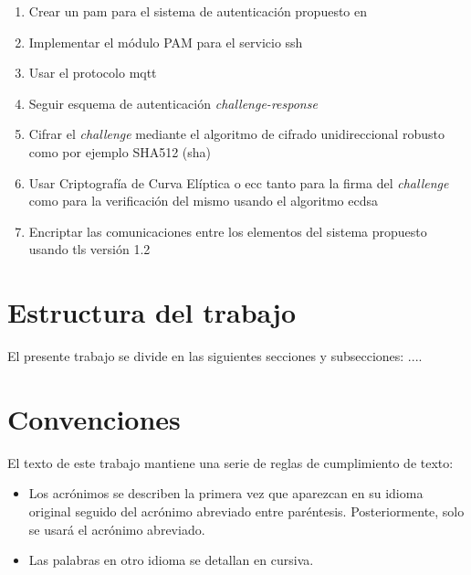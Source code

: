 \begin{enumerate}
    \item Crear un \acrfull{pam} para el sistema de autenticación propuesto en \cite{multipauthpaper}
    \item Implementar el módulo PAM para el servicio \acrfull{ssh}
    \item Usar el protocolo \acrfull{mqtt}
    \item Seguir esquema de autenticación \textit{challenge-response} \cite{newman2010salted}
    \item Cifrar el \textit{challenge} mediante el algoritmo de cifrado unidireccional robusto como por ejemplo SHA512 
    (\acrlong{sha})
    \item Usar Criptografía de Curva Elíptica o \acrfull{ecc} tanto para la firma del \textit{challenge} como para la verificación del mismo 
    usando el algoritmo \acrfull{ecdsa}
    \item Encriptar las comunicaciones entre los elementos del sistema propuesto usando \acrfull{tls} versión 1.2
\end{enumerate}

\section{Estructura del trabajo}

El presente trabajo se divide en las siguientes secciones y subsecciones: ....

\section{Convenciones}

El texto de este trabajo mantiene una serie de reglas de cumplimiento de texto:
 
\begin{itemize}
    \item Los acrónimos se describen la primera vez que aparezcan en su idioma original seguido del acrónimo abreviado entre 
    paréntesis. Posteriormente, solo se usará el acrónimo abreviado.
    \item Las palabras en otro idioma se detallan en cursiva.
\end{itemize}